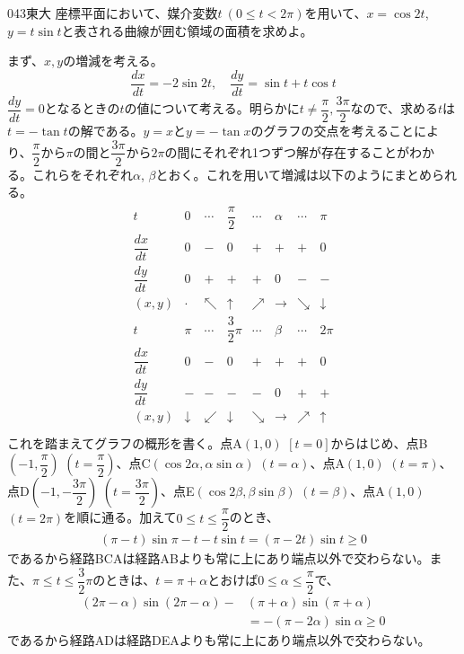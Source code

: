 \begin{thm}{043}{\maru}{東大}
 座標平面において、媒介変数$t~(0\le t< 2\pi)$を用いて、$x=\cos2t$, $y=t\sin t$と表される曲線が囲む領域の面積を求めよ。
\end{thm}

まず、$x, y$の増減を考える。
\[ \frac{dx}{dt}=-2\sin 2t, \quad  \frac{dy}{dt}=\sin t+t\cos t \]
$\dfrac{dy}{dt}=0$となるときの$t$の値について考える。明らかに$t\neq \dfrac{\pi}{2}, \dfrac{3\pi}{2}$なので、求める$t$は$t=-\tan t$の解である。$y=x$と$y=-\tan x$のグラフの交点を考えることにより、$\dfrac{\pi}{2}$から$\pi$の間と$\dfrac{3\pi}{2}$から$2\pi$の間にそれぞれ1つずつ解が存在することがわかる。これらをそれぞれ$\alpha$, $\beta$とおく。これを用いて増減は以下のようにまとめられる。
\begin{align*}
\begin{array}{c|c|c|c|c|c|c|c}
 t & 0 & \cdots & \dfrac{\pi}{2} & \cdots & \alpha & \cdots & \pi \\[1.0ex] \hline
 \dfrac{dx}{dt} & 0 & - & 0 & + & + & + & 0 \\[1.0ex] \hline
 \dfrac{dy}{dt} & 0 & + & + & + & 0 & - & - \\[1.0ex] \hline
 (x, y) & \cdot & \nwarrow & \uparrow & \nearrow & \to & \searrow & \downarrow \\ \hline\hline
 t & \pi & \cdots & \dfrac{3}{2}\pi & \cdots & \beta & \cdots & 2\pi \\[1.0ex] \hline
 \dfrac{dx}{dt} & 0 & - & 0 & + & + & + & 0 \\[1.0ex] \hline
 \dfrac{dy}{dt} & - & - & - & - & 0 & + & + \\[1.0ex] \hline
 (x, y) & \downarrow & \swarrow & \downarrow & \searrow & \to & \nearrow & \uparrow \\
 \end{array}
\end{align*}
これを踏まえてグラフの概形を書く。点A$(1, 0)$ $[t=0]$からはじめ、点B$\left(-1, \dfrac{\pi}{2}\right)$ $\left(t=\dfrac{\pi}{2}\right)$、点C$(\cos2\alpha, \alpha\sin\alpha)$ $(t=\alpha)$、点A$(1, 0)$ $(t=\pi)$、点D$\left(-1, -\dfrac{3\pi}{2}\right)$ $\left(t=\dfrac{3\pi}{2}\right)$、点E$(\cos2\beta, \beta\sin\beta)$ $(t=\beta)$、点A$(1, 0)$ $(t=2\pi)$を順に通る。加えて$0\le t \le \dfrac{\pi}{2}$のとき、
\begin{align*}
 (\pi-t)\sin{\pi-t}-t\sin t=(\pi-2t)\sin t \ge 0
\end{align*}
であるから経路BCAは経路ABよりも常に上にあり端点以外で交わらない。また、$\pi\le t\le \dfrac{3}{2}\pi$のときは、$t=\pi+\alpha$とおけば$0\le\alpha\le\dfrac{\pi}{2}$で、
\begin{align*}
 (2\pi-\alpha)\sin(2\pi-\alpha)-&(\pi+\alpha)\sin(\pi+\alpha) \\
 &=-(\pi-2\alpha)\sin\alpha \ge 0
\end{align*}
であるから経路ADは経路DEAよりも常に上にあり端点以外で交わらない。

